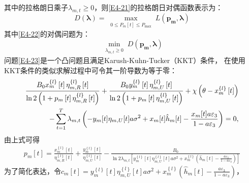 其中的拉格朗日乘子$\lambda_{m,t}\geq 0$，则\eqref{E4-21}的拉格朗日对偶函数表示为：
\begin{equation} \label{E4-22}
D(\mathbf{\lambda})=\max _{\substack{0 \leq P_m[t] \leq P_{\max }}} L\left(\mathbf{p_m},\mathbf{\lambda}\right)
\end{equation}
其中\eqref{E4-22}的对偶问题为：
\begin{equation} \label{E4-23}
\min_{\substack{\lambda_{m,t}\geq 0}} D\left(\mathbf{p_m},\mathbf{\lambda}\right)
\end{equation}
问题\eqref{E4-23}是一个凸问题且满足Karush-Kuhn-Tucker（KKT）条件，
在使用KKT条件的类似求解过程中可令其一阶导数为等于零：
\begin{align}\label{E4-24}
\frac{{{B}_{0}}x_{m}^{\left\{ l \right\}}\left[ t \right]\eta _{m,R}^{\left\{ l \right\}}\left[ t \right]}{\ln 2\left( 1+{{p}_{m}}\left[ t \right]\eta _{m,R}^{\left\{ l \right\}}\left[ t \right] \right)}+\frac{{{B}_{0}}y_{m}^{\left\{ l \right\}}\left[ t \right]\eta _{m,U}^{\left\{ l \right\}}\left[ t \right]}{\ln 2\left( 1+{{p}_{m}}\left[ t \right]\eta _{m,U}^{\left\{ l \right\}}\left[ t \right] \right)}+\chi \left( \theta -x_{m}^{\left\{ l \right\}}\left[ t \right] \right) \\   \notag
-\sum\limits_{t=1}^{T}{{{\lambda }_{m,t}}}\left( -{{y}_{m}}[t]{{\eta }_{m,U}}[t]a{{\sigma }^{2}}+{{x}_{m}}[t]{{{\hat{h}}}_{m}}[t]-\frac{{{x}_{m}}[t]a{{\varepsilon }_{3}}}{1-a{{\varepsilon }_{3}}} \right)=0,
\end{align}
由上式可得
\begin{align}\label{E4-25}
\!\!\!\!{{p}_{m}}\left[ t \right]=\frac{x_{m}^{\left\{ l \right\}}\left[ t \right]}{\eta _{m,R}^{\left\{ l \right\}}\left[ t \right]}+\frac{y_{m}^{\left\{ l \right\}}\left[ t \right]}{\eta _{m,U}^{\left\{ l \right\}}\left[ t \right]}-\frac{{{B}_{0}}}{\ln 2{{\lambda }_{m,t}}\left[ y_{m}^{\left\{ l \right\}}\left[ t \right]\eta _{m,U}^{\left\{ l \right\}}\left[ t \right]a{{\sigma }^{2}}+x_{m}^{\left\{ l \right\}}\left( {{{\hat{h}}}_{m}}[t]-\frac{a{{\varepsilon }_{3}}}{1-a{{\varepsilon }_{3}}} \right) \right]}
\end{align}
为了简化表达，令${{c}_{m}}\left[ t \right]=y_{m}^{\left\{ l \right\}}\left[ t \right]\eta _{m,U}^{\left\{ l \right\}}\left[ t \right]a{{\sigma }^{2}}+x_{m}^{\left\{ l \right\}}\left( {{{\hat{h}}}_{m}}[t]-\frac{a{{\varepsilon }_{3}}}{1-a{{\varepsilon }_{3}}} \right)$，

